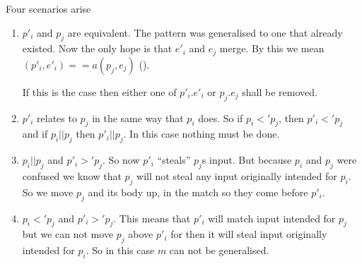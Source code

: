 
Four scenarios arise
\begin{enumerate}
\item $p'_i$ and $p_j$ are equivalent. The pattern was generalised to one that
  already existed. Now the only hope is that $e'_i$ and $e_j$ merge. By this we
  mean $(p'_i, e'_i) ==a (p_j, e_j)$ ().

  If this is the case then either one of $p'_i \texttt{.} e'_i$ or $p_j
  \texttt{.} e_j$ shall be removed. \label{item:gen-scen-1}
\item $p'_i$ relates to $p_j$ in the same way that $p_i$ does. So if $p_i <'
  p_j$, then $p'_i <' p_j$ and if $p_i || p_j$ then $p'_i || p_j$. In this case
  nothing must be done. \label{item:gen-scen-2}
\item $p_i || p_j$ and $p'_i >' p_j$. So now $p'_i$ ``steals'' $p_j$s input. But
  because $p_i$ and $p_j$ were confused we know that $p_j$ will not steal any
  input originally intended for $p_i$. So we move $p_j$ and its body up, in the
  match so they come before $p'_i$. \label{item:gen-scen-3}
\item $p_i <' p_j$ and $p'_i >' p_j$. This means that $p'_i$ will match input
  intended for $p_j$ but we can not move $p_j$ above $p'_i$ for then it will
  steal input originally intended for $p_i$. So in this case $m$ can not be
  generalised. \label{item:gen-scen-4}
\end{enumerate}

